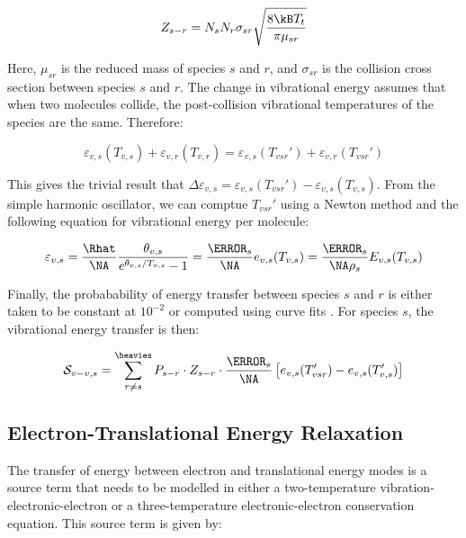 \documentclass[10pt]{article}
\begin{document}
\begin{flushleft}
\begin{equation*}
    Z_{s-r} = N_s N_r \sigma_{sr} \sqrt{\frac{8 \kB T_t}{\pi \mu_{sr}}}
\end{equation*}

Here, $\mu_{sr}$ is the reduced mass of species $s$ and $r$, and $\sigma_{sr}$ is the collision cross section between species $s$ and $r$. The change in vibrational energy assumes that when two molecules collide, the post-collision vibrational temperatures of the species are the same. Therefore:

\begin{equation}
    \varepsilon_{v,s} (T_{v,s}) + \varepsilon_{v,r}(T_{v,r}) = \varepsilon_{v,s} (T_{vsr}') + \varepsilon_{v,r} (T_{vsr}')
\end{equation}

This gives the trivial result that $\Delta \varepsilon_{v,s} = \varepsilon_{v,s} (T_{vsr}') - \varepsilon_{v,s} (T_{v,s})$. From the simple harmonic oscillator, we can comptue $T_{vsr}'$ using a Newton method and the following equation for vibrational energy per molecule:

\begin{equation*}
    \varepsilon_{v,s} = \frac{\Rhat}{\NA} \frac{\theta_{v,s}}{e^{\theta_{v,s}/T_{v,s}} - 1} = \frac{\MW_s}{\NA} e_{v,s}(T_{v,s}) = \frac{\MW_s}{\NA \rho_s} E_{v,s}(T_{v,s})
\end{equation*}

Finally, the probabability of energy transfer between species $s$ and $r$ is either taken to be constant at $10^{-2}$ \cite{candlerthesis} or computed using curve fits \cite{chinnappan2026}.  For species $s$, the vibrational energy transfer is then:

\begin{equation*}
    \mathcal{S}_{v-v,s} = \sum_{r \neq s}^{\heavies} P_{s-r} \cdot Z_{s-r} \cdot \frac{\MW_s}{\NA} \bb{e_{v,s}(T_{vsr}') - e_{v,s}(T_{v,s}')}
\end{equation*}


\subsection{Electron-Translational Energy Relaxation}
\label{sec:el-trans-relax}
The transfer of energy between electron and translational energy modes is a source term that needs to be modelled in either a two-temperature vibration-electronic-electron or a three-temperature electronic-electron conservation equation. This source term is given by:


\end{flushleft}
\end{document}
